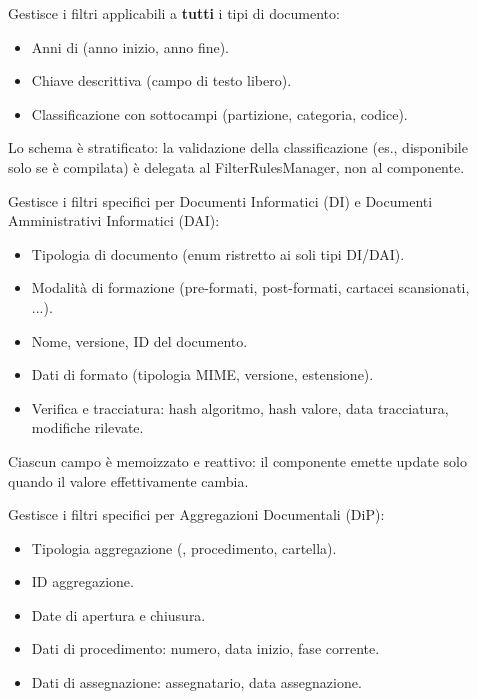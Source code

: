 \begin{description}
    \item[] Gestisce i filtri applicabili a \textbf{tutti} i tipi di documento:
    \begin{itemize}
        \item Anni di  (anno inizio, anno fine).
        \item Chiave descrittiva (campo di testo libero).
        \item Classificazione con sottocampi (partizione, categoria, codice).
    \end{itemize}
    Lo schema è stratificato: la validazione della classificazione (es.,  disponibile solo se  è compilata) è delegata al FilterRulesManager, non al componente.
    
    \item[] Gestisce i filtri specifici per Documenti Informatici (DI) e Documenti Amministrativi Informatici (DAI):
    \begin{itemize}
        \item Tipologia di documento (enum ristretto ai soli tipi DI/DAI).
        \item Modalità di formazione (pre-formati, post-formati, cartacei scansionati, ...).
        \item Nome, versione, ID del documento.
        \item Dati di formato (tipologia MIME, versione, estensione).
        \item Verifica e tracciatura: hash algoritmo, hash valore, data tracciatura, modifiche rilevate.
    \end{itemize}
    Ciascun campo è memoizzato e reattivo: il componente emette update solo quando il valore effettivamente cambia.
    
    \item[] Gestisce i filtri specifici per Aggregazioni Documentali (DiP):
    \begin{itemize}
        \item Tipologia aggregazione (, procedimento, cartella).
        \item ID aggregazione.
        \item Date di apertura e chiusura.
        \item Dati di procedimento: numero, data inizio, fase corrente.
        \item Dati di assegnazione: assegnatario, data assegnazione.
    \end{itemize}
\end{description}

